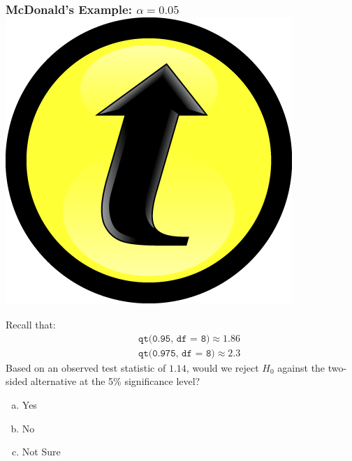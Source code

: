 \documentclass[handout]{beamer}
\begin{document}
\begin{frame}[t]
\frametitle{McDonald's Example: $\alpha = 0.05$\hfill \includegraphics[scale = 0.05]{./images/clicker}}
Recall that:
\begin{eqnarray*}
		&&\texttt{qt(0.95, df  = 8)}\approx 1.86\\
		 &&\texttt{qt(0.975, df  = 8)}\approx 2.3
	\end{eqnarray*}
Based on an observed test statistic of $1.14$, would we reject $H_0$ against the \alert{two-sided} alternative at the 5\% significance level?
\begin{enumerate}[(a)]
	\item Yes
	\item No
	\item Not Sure
\end{enumerate}

\end{frame}

\end{document}
